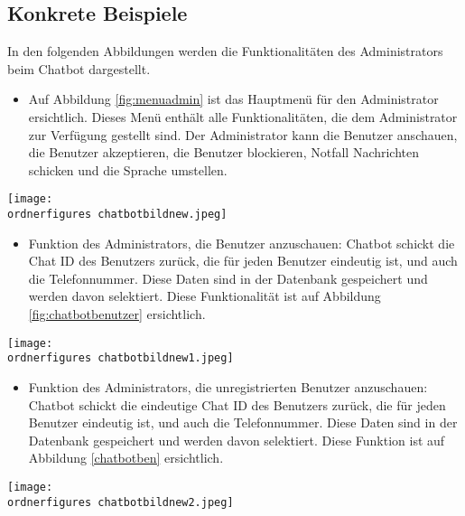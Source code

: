 \subsection{Konkrete Beispiele} 
In den folgenden Abbildungen werden die Funktionalitäten des Administrators beim Chatbot dargestellt.
\begin{itemize}
	\item Auf Abbildung \ref{fig:menuadmin} ist das Hauptmen\"u f\"ur den Administrator ersichtlich. Dieses Men\"u enth\"alt alle Funktionalit\"aten, die dem Administrator zur Verf\"ugung gestellt sind. Der Administrator kann die Benutzer anschauen, die Benutzer akzeptieren, die Benutzer blockieren, Notfall Nachrichten schicken und die Sprache umstellen. 
\end{itemize}
\begin{center}
	\captionsetup{type=figure}
	\texttt{[image: \\ordnerfigures chatbotbildnew.jpeg]}
	\caption{Hauptmen\"u f\"ur den Administrator} 
	\label{fig:menuadmin}
\end{center}
\begin{itemize}
	\item Funktion des Administrators, die Benutzer anzuschauen: Chatbot schickt die Chat ID des Benutzers zurück, die für jeden Benutzer eindeutig ist, und auch die Telefonnummer. Diese Daten sind in der Datenbank gespeichert und werden davon selektiert. Diese Funktionalit\"at ist auf Abbildung \ref{fig:chatbotbenutzer} ersichtlich.
\end{itemize}
\begin{center}
	\captionsetup{type=figure}
	\texttt{[image: \\ordnerfigures chatbotbildnew1.jpeg]}
	\caption{Auflistung der Chatbot-Benutzer} 
	\label{fig:chatbotbenutzer}
\end{center}
\begin{itemize}
	\item Funktion des Administrators, die unregistrierten Benutzer anzuschauen: Chatbot schickt die eindeutige Chat ID des Benutzers zurück, die für jeden Benutzer eindeutig ist, und auch die Telefonnummer. Diese Daten sind in der Datenbank gespeichert und werden davon selektiert. Diese Funktion ist auf Abbildung \ref{chatbotben} ersichtlich.
\end{itemize}
\begin{center}
	\captionsetup{type=figure}
	\texttt{[image: \\ordnerfigures chatbotbildnew2.jpeg]}
	\caption{Auflistung der unregistrierten Benutzer}
	\label{chatbotben}
\end{center}
